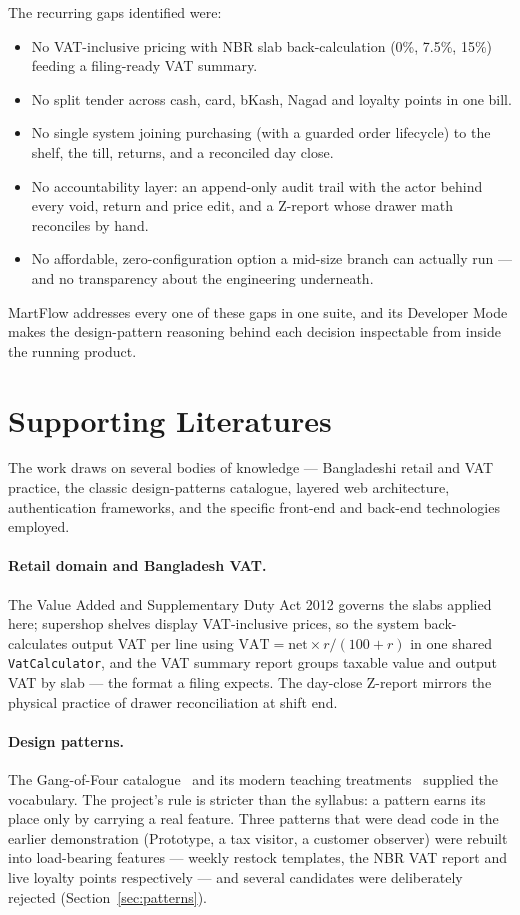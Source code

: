 \documentclass[12pt,a4paper]{report}
\begin{document}
The recurring gaps identified were:
\begin{itemize}
  \item No VAT-inclusive pricing with NBR slab back-calculation (0\%, 7.5\%, 15\%) feeding
        a filing-ready VAT summary.
  \item No split tender across cash, card, bKash, Nagad and loyalty points in one bill.
  \item No single system joining purchasing (with a guarded order lifecycle) to the shelf,
        the till, returns, and a reconciled day close.
  \item No accountability layer: an append-only audit trail with the actor behind every
        void, return and price edit, and a Z-report whose drawer math reconciles by hand.
  \item No affordable, zero-configuration option a mid-size branch can actually run ---
        and no transparency about the engineering underneath.
\end{itemize}

MartFlow addresses every one of these gaps in one suite, and its Developer Mode makes the
design-pattern reasoning behind each decision inspectable from inside the running product.

\section{Supporting Literatures}
The work draws on several bodies of knowledge --- Bangladeshi retail and VAT practice, the
classic design-patterns catalogue, layered web architecture, authentication frameworks, and
the specific front-end and back-end technologies employed.

\paragraph{Retail domain and Bangladesh VAT.} The Value Added and Supplementary Duty Act
2012 governs the slabs applied here; supershop shelves display VAT-inclusive prices, so the
system back-calculates output VAT per line using
$\mathrm{VAT} = \mathrm{net} \times r/(100+r)$ in one shared \texttt{VatCalculator}, and
the VAT summary report groups taxable value and output VAT by slab --- the format a filing
expects. The day-close Z-report mirrors the physical practice of drawer reconciliation at
shift end.

\paragraph{Design patterns.} The Gang-of-Four catalogue~\cite{gof} and its modern
teaching treatments~\cite{headfirst,refactoringguru} supplied the vocabulary. The project's
rule is stricter than the syllabus: a pattern earns its place only by carrying a real
feature. Three patterns that were dead code in the earlier demonstration (Prototype, a tax
visitor, a customer observer) were rebuilt into load-bearing features --- weekly restock
templates, the NBR VAT report and live loyalty points respectively --- and several
candidates were deliberately rejected (Section~\ref{sec:patterns}).
\end{document}
